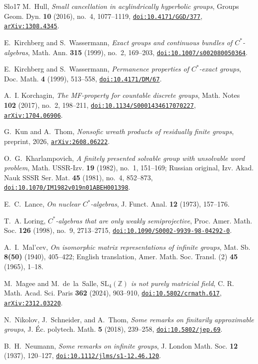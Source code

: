 \documentclass[11pt]{amsart}
\newcommand{\doi}[1]{\href{https://doi.org/#1}{\nolinkurl{doi:#1}}}
\newcommand{\arxiv}[1]{\href{https://arxiv.org/abs/#1}{\nolinkurl{arXiv:#1}}}
\theoremstyle{definition}
\theoremstyle{remark}
\theoremstyle{plain}
\begin{document}
\begin{thebibliography}{Slo17}
M.~Hull,
\emph{Small cancellation in acylindrically hyperbolic groups},
Groups Geom. Dyn. \textbf{10} (2016), no.~4, 1077--1119,
\doi{10.4171/GGD/377}, \arxiv{1308.4345}.

E.~Kirchberg and S.~Wassermann,
\emph{Exact groups and continuous bundles of $C^*$-algebras},
Math. Ann. \textbf{315} (1999), no.~2, 169--203,
\doi{10.1007/s002080050364}.

E.~Kirchberg and S.~Wassermann,
\emph{Permanence properties of $C^*$-exact groups},
Doc. Math. \textbf{4} (1999), 513--558,
\doi{10.4171/DM/67}.

A.~I. Korchagin,
\emph{The MF-property for countable discrete groups},
Math. Notes \textbf{102} (2017), no.~2, 198--211,
\doi{10.1134/S0001434617070227}, \arxiv{1704.06906}.

G.~Kun and A.~Thom,
\emph{Nonsofic wreath products of residually finite groups},
preprint, 2026, \arxiv{2608.06222}.

O.~G.~Kharlampovich,
\emph{A finitely presented solvable group with unsolvable word problem},
Math. USSR-Izv. \textbf{19} (1982), no.~1, 151--169;
Russian original, Izv. Akad. Nauk SSSR Ser. Mat. \textbf{45} (1981),
no.~4, 852--873,
\doi{10.1070/IM1982v019n01ABEH001398}.

E.~C.~Lance,
\emph{On nuclear $C^*$-algebras},
J. Funct. Anal. \textbf{12} (1973), 157--176.

T.~A. Loring,
\emph{$C^*$-algebras that are only weakly semiprojective},
Proc. Amer. Math. Soc. \textbf{126} (1998), no.~9, 2713--2715,
\doi{10.1090/S0002-9939-98-04292-0}.

A.~I.~Mal'cev,
\emph{On isomorphic matrix representations of infinite groups},
Mat. Sb. \textbf{8(50)} (1940), 405--422;
English translation, Amer. Math. Soc. Transl. (2) \textbf{45} (1965), 1--18.

M.~Magee and M.~de~la~Salle,
\emph{$\mathrm{SL}_4(\mathbb{Z})$ is not purely matricial field},
C. R. Math. Acad. Sci. Paris \textbf{362} (2024), 903--910,
\doi{10.5802/crmath.617}, \arxiv{2312.03220}.

N.~Nikolov, J.~Schneider, and A.~Thom,
\emph{Some remarks on finitarily approximable groups},
J. \'Ec. polytech. Math. \textbf{5} (2018), 239--258,
\doi{10.5802/jep.69}.

B.~H.~Neumann,
\emph{Some remarks on infinite groups},
J. London Math. Soc. \textbf{12} (1937), 120--127,
\doi{10.1112/jlms/s1-12.46.120}.


\end{thebibliography}
\end{document}
